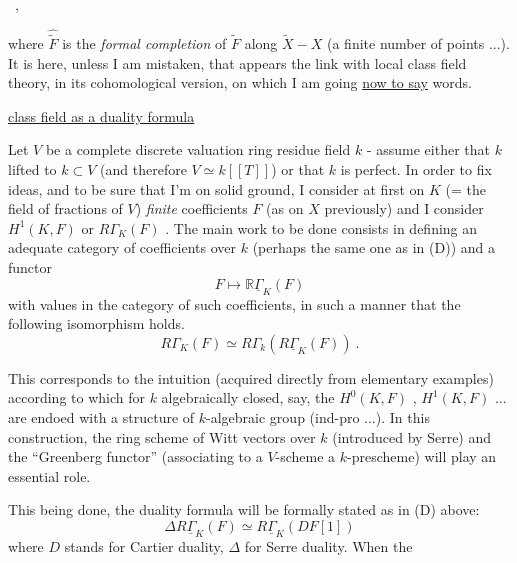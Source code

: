 
\ ,

where $\hat{\tilde{F}}$ is the \emph{formal completion} of $\tilde{F}$ along $\tilde{X} - X$ (a finite number of
points ...). It is here, unless I am mistaken, that appears the link with
local class field theory, in its cohomological version, on which I am going
\uline{now to say}  words. \qquad * \qquad * \qquad *

\uline{  class field  as a duality formula}

Let $V$ be a complete discrete valuation ring  residue field $k$ - assume
either that $k$  lifted to $k \subset V$ (and therefore $V \simeq k[[T]]$) or
that $k$ is perfect. In order to fix ideas, and to be sure that I'm on solid
ground, I consider at first on $K$ (= the field of fractions of $V$) \emph{finite}
coefficients $F$ (as on $X$ previously) and I consider  $H^1(K, F)$\hand{,} or
$R\Gamma_K(F)$ . The main work to be done consists in defining an adequate category
of coefficients over $k$ (perhaps the same one as in (D)) and a functor
\[ F \longmapsto \mathbb{R}\underline{\Gamma}_K(F) \]
with values in the category of such coefficients, in such a manner that the
following isomorphism holds.
\[ R\Gamma_K(F) \simeq R\Gamma_k(R\underline{\Gamma}_K(F)) \ . \]

This corresponds to the intuition (acquired directly from elementary
examples) according to which for $k$ algebraically closed, say, the
$H^0(K, F)$ , $H^1(K, F)$ ... are endoed with a structure of $k$-algebraic group
(ind-pro ...). In this construction, the ring scheme of Witt vectors over
$k$ (introduced by Serre) and the ``Greenberg functor'' (associating to a
$V$-scheme a $k$-prescheme) will play an essential role.

This being done, the duality formula will be formally stated as in (D)
above:
\[ \Delta R\underline{\Gamma}_K(F) \simeq R\underline{\Gamma}_K(DF[1]) \]
where $D$ stands for Cartier duality, $\Delta$ for Serre duality. When the

